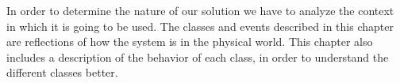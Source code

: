 In order to determine the nature of our solution we have to analyze the context in which it is going to be used.
The classes and events described in this chapter are reflections of how the system is in the physical world.
This chapter also includes a description of the behavior of each class, in order to understand the different classes better.







